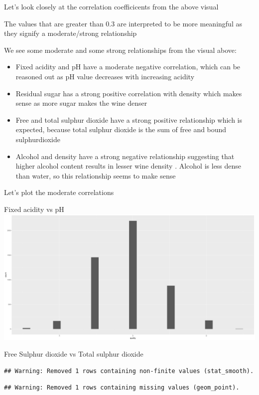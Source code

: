 \documentclass[]{article}
\begin{document}
Let's look closely at the correlation coefficicents from the above
visual

The values that are greater than \textbar{}0.3\textbar{} are interpreted
to be more meaningful as they signify a moderate/strong relationship

We see some moderate and some strong relationships from the visual
above:

\begin{itemize}
\item
  Fixed acidity and pH have a moderate negative correlation, which can
  be reasoned out as pH value decreases with increasing acidity
\item
  Residual sugar has a strong positive correlation with density which
  makes sense as more sugar makes the wine denser
\item
  Free and total sulphur dioxide have a strong positive relationship
  which is expected, because total sulphur dioxide is the sum of free
  and bound sulphurdioxide
\item
  Alcohol and density have a strong negative relationship suggesting
  that higher alcohol content results in lesser wine density . Alcohol
  is less dense than water, so this relationship seems to make sense
\end{itemize}

Let's plot the moderate correlations

Fixed acidity vs pH
\includegraphics{White_wine_quality_files/figure-latex/unnamed-chunk-25-1.pdf}

Free Sulphur dioxide vs Total sulphur dioxide

\begin{verbatim}
## Warning: Removed 1 rows containing non-finite values (stat_smooth).
\end{verbatim}

\begin{verbatim}
## Warning: Removed 1 rows containing missing values (geom_point).
\end{verbatim}
\end{document}
